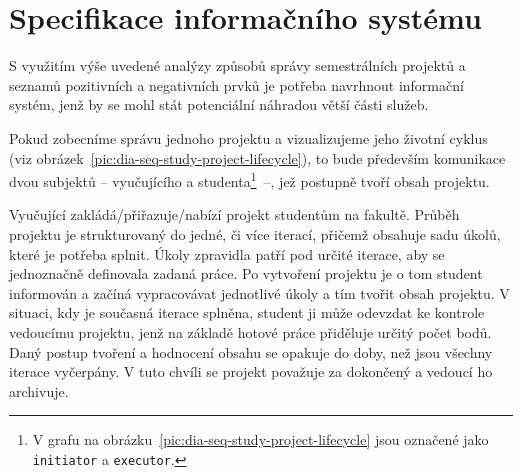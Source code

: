 \chapter{Specifikace informačního systému}

S využitím výše uvedené analýzy způsobů správy semestrálních projektů a seznamů pozitivních a negativních prvků je potřeba navrhnout informační systém, jenž by se mohl stát potenciální náhradou větší části služeb. 

Pokud zobecníme správu jednoho projektu a vizualizujeme jeho životní
cyklus (viz obrázek~\ref{pic:dia-seq-study-project-lifecycle}), to bude především komunikace dvou subjektů -- vyučujícího a studenta\footnote{V grafu na obrázku~\ref{pic:dia-seq-study-project-lifecycle} jsou označené jako \texttt{initiator} a \texttt{executor}.}~--, jež postupně tvoří obsah projektu.

Vyučující zakládá/přiřazuje/nabízí projekt studentům na fakultě. Průběh projektu je strukturovaný do jedné, či více iterací, přičemž obsahuje sadu úkolů, které je potřeba splnit. Úkoly zpravidla patří pod určité iterace, aby se jednoznačně definovala zadaná práce. Po vytvoření projektu je o tom student informován a začíná vypracovávat jednotlivé úkoly a tím tvořit obsah projektu. V situaci, kdy je současná iterace splněna, student ji může odevzdat ke kontrole vedoucímu projektu, jenž na základě hotové práce přiděluje určitý počet bodů. Daný postup tvoření a hodnocení obsahu se opakuje do doby, než jsou všechny iterace vyčerpány. V tuto chvíli se projekt považuje za dokončený a vedoucí ho archivuje.


